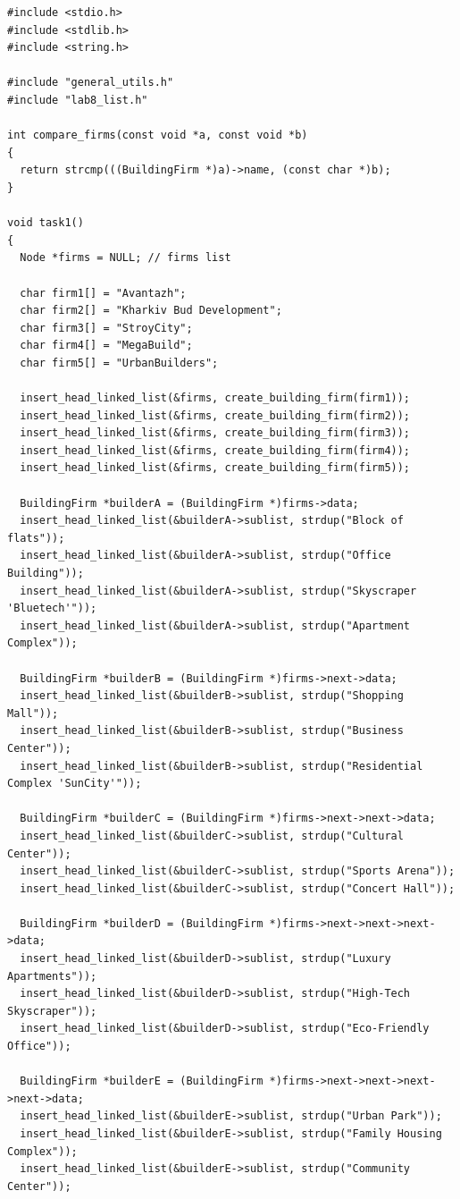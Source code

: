 \begin{lstlisting}[style=customc]
#include <stdio.h>
#include <stdlib.h>
#include <string.h>

#include "general_utils.h"
#include "lab8_list.h"

int compare_firms(const void *a, const void *b)
{
  return strcmp(((BuildingFirm *)a)->name, (const char *)b);
}

void task1()
{
  Node *firms = NULL; // firms list

  char firm1[] = "Avantazh";
  char firm2[] = "Kharkiv Bud Development";
  char firm3[] = "StroyCity";
  char firm4[] = "MegaBuild";
  char firm5[] = "UrbanBuilders";

  insert_head_linked_list(&firms, create_building_firm(firm1));
  insert_head_linked_list(&firms, create_building_firm(firm2));
  insert_head_linked_list(&firms, create_building_firm(firm3));
  insert_head_linked_list(&firms, create_building_firm(firm4));
  insert_head_linked_list(&firms, create_building_firm(firm5));

  BuildingFirm *builderA = (BuildingFirm *)firms->data;
  insert_head_linked_list(&builderA->sublist, strdup("Block of flats"));
  insert_head_linked_list(&builderA->sublist, strdup("Office Building"));
  insert_head_linked_list(&builderA->sublist, strdup("Skyscraper 'Bluetech'"));
  insert_head_linked_list(&builderA->sublist, strdup("Apartment Complex"));

  BuildingFirm *builderB = (BuildingFirm *)firms->next->data;
  insert_head_linked_list(&builderB->sublist, strdup("Shopping Mall"));
  insert_head_linked_list(&builderB->sublist, strdup("Business Center"));
  insert_head_linked_list(&builderB->sublist, strdup("Residential Complex 'SunCity'"));

  BuildingFirm *builderC = (BuildingFirm *)firms->next->next->data;
  insert_head_linked_list(&builderC->sublist, strdup("Cultural Center"));
  insert_head_linked_list(&builderC->sublist, strdup("Sports Arena"));
  insert_head_linked_list(&builderC->sublist, strdup("Concert Hall"));

  BuildingFirm *builderD = (BuildingFirm *)firms->next->next->next->data;
  insert_head_linked_list(&builderD->sublist, strdup("Luxury Apartments"));
  insert_head_linked_list(&builderD->sublist, strdup("High-Tech Skyscraper"));
  insert_head_linked_list(&builderD->sublist, strdup("Eco-Friendly Office"));

  BuildingFirm *builderE = (BuildingFirm *)firms->next->next->next->next->data;
  insert_head_linked_list(&builderE->sublist, strdup("Urban Park"));
  insert_head_linked_list(&builderE->sublist, strdup("Family Housing Complex"));
  insert_head_linked_list(&builderE->sublist, strdup("Community Center"));


\end{lstlisting}
